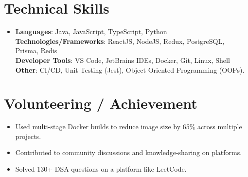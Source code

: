 \documentclass[letterpaper,11pt]{article}
\newcommand{\resumeItem}[1]{
  \item\small{
    {#1 \vspace{-2pt}}
  }
}
\newcommand{\resumeItemListStart}{\begin{itemize}}
\newcommand{\resumeItemListEnd}{\end{itemize}\vspace{-5pt}}
\begin{document}
%
\section{Technical Skills}
 \vspace{5pt}
 \begin{itemize}[leftmargin=0.15in, label={}]
    \item{
     \textbf{Languages}{: Java, JavaScript, TypeScript, Python} \\
     \vspace{4pt}
     \textbf{Technologies/Frameworks}{: ReactJS, NodeJS, Redux, PostgreSQL, Prisma, Redis} \\
     \vspace{4pt}
     \textbf{Developer Tools}{: VS Code, JetBrains IDEs, Docker, Git, Linux, Shell} \\
     \vspace{4pt}
     \textbf{Other}{: CI/CD, Unit Testing (Jest), Object Oriented Programming (OOPs).} \\
    }
 \end{itemize}
 \vspace{-10pt}



\section{Volunteering / Achievement}
 \vspace{5pt}
    \resumeItemListStart
        \resumeItem{Used multi-stage Docker builds to reduce image size by 65\% across multiple projects.}
        \resumeItem{Contributed to community discussions and knowledge-sharing on platforms.}
        \resumeItem{Solved 130+ DSA questions on a platform like LeetCode.}
    \resumeItemListEnd


            
\end{document}
